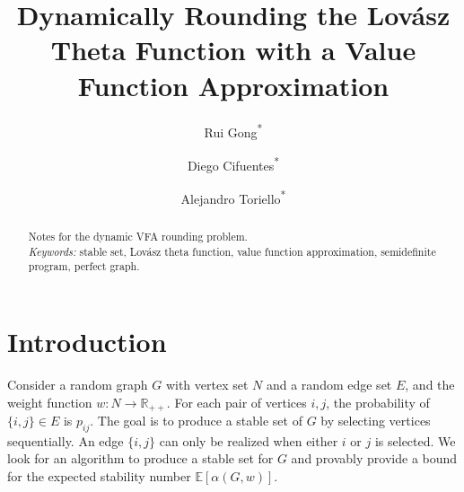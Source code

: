 \documentclass[10pt,leqno]{amsart}
\newcommand{\R}{\mathbb{R}}
\newcommand{\E}{\mathbb{E}}
\begin{document}
\title{Dynamically Rounding the Lov\'asz Theta Function with a Value Function Approximation} %
\author[R. Gong]{Rui Gong\textsuperscript{*}}
\author[D. Cifuentes]{Diego Cifuentes\textsuperscript{*}}
\author[A. Toriello]{Alejandro Toriello\textsuperscript{*}}

\let\thefootnote\relax
{} %

\begin{abstract}
  Notes for the dynamic VFA rounding problem.\\
  \smallskip
  \noindent \textit{Keywords:} stable set,
  Lov\'asz theta function,
  value function approximation,
  semidefinite program,
  perfect graph.
\end{abstract} %
\maketitle
\section{Introduction}
Consider a random graph $G$ with vertex set $N$ and a random edge set $E$, and the weight function $w:N\to \R_{++}$.
For each pair of vertices $i,j$, the probability of $\{i,j\}\in E$ is $p_{ij}$.
The goal is to produce a stable set of $G$ by selecting vertices sequentially.
An edge $\{i,j\}$ can only be realized when either $i$ or $j$ is selected.
We look for an algorithm to produce a stable set for $G$ and provably provide a bound for the expected stability number $\E[\alpha(G,w)]$.
\end{document}
